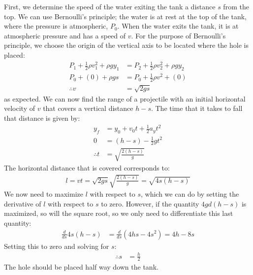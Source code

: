 \begin{solution}
	
	First, we determine the speed of the water exiting the tank a distance $s$ from the top. We can use Bernoulli's principle; the water is at rest at the top of the tank, where the pressure is atmospheric, $P_0$. When the water exits the tank, it is at atmospheric pressure and has a speed of $v$. For the purpose of Bernoulli's principle, we choose the origin of the vertical axis to be located where the hole is placed:
	\begin{align*}
	P_1 + \frac{1}{2}\rho v_1^2 + \rho gy_1 &=P_2 + \frac{1}{2}\rho v_2^2 + \rho gy_2\\
	P_0 + (0) +\rho g s&=P_0+\frac{1}{2}\rho v^2 + (0)\\
	\therefore v&=\sqrt{2gs}
	\end{align*}
	as expected. We can now find the range of a projectile with an initial horizontal velocity of $v$ that covers a vertical distance $h-s$. The time that it takes to fall that distance is given by:
	\begin{align*}
	y_f &= y_0+v_0t+\frac{1}{2}a_yt^2\\
	0 &= (h-s)-\frac{1}{2}gt^2\\
	\therefore t &= \sqrt{\frac{2(h-s)}{g}}
	\end{align*}
	The horizontal distance that is covered corresponds to:
	\begin{align*}
	l = vt = \sqrt{2gs}\sqrt{\frac{2(h-s)}{g}}=\sqrt{4s(h-s)}
	\end{align*}
	We now need to maximize $l$ with respect to $s$, which we can do by setting the derivative of $l$ with respect to $s$ to zero. However, if the quantity $4gd(h-s)$ is maximized, so will the square root, so we only need to differentiate this last quantity:
	\begin{align*}
	\frac{d}{ds}4s(h-s)&=\frac{d}{ds}(4hs-4s^2)=4h-8s
	\end{align*}
	Setting this to zero and solving for $s$:
	\begin{align*}
	\therefore s&=\frac{h}{2}
	\end{align*}
	The hole should be placed half way down the tank.
	
\end{solution}

